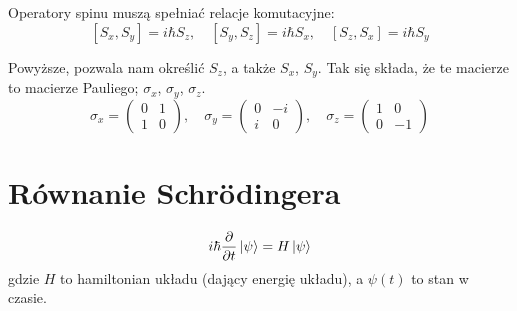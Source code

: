 \documentclass{../notatki}
\begin{document}
Operatory spinu muszą spełniać relacje komutacyjne:
$$
[S_x, S_y] = i\hbar S_z, \quad [S_y, S_z] = i\hbar S_x, \quad [S_z,
S_x] = i\hbar S_y
$$

Powyższe, pozwala nam określić $S_z$, a także $S_x$, $S_y$. Tak się składa, że
te macierze to macierze Pauliego; $\sigma_x$, $\sigma_y$, $\sigma_z$.
$$
\sigma_x =
\begin{pmatrix} 0 & 1 \\ 1 & 0
\end{pmatrix}, \quad \sigma_y =
\begin{pmatrix} 0 & -i \\ i & 0
\end{pmatrix}, \quad \sigma_z =
\begin{pmatrix} 1 & 0 \\ 0 & -1
\end{pmatrix}
$$

\section{Równanie Schrödingera}

$$
i\hbar \frac{\partial}{\partial t} \ket{\psi} = H \ket{\psi}
$$
gdzie $H$ to hamiltonian układu (dający energię układu), a $\psi(t)$ to stan
w czasie.
\end{document}
